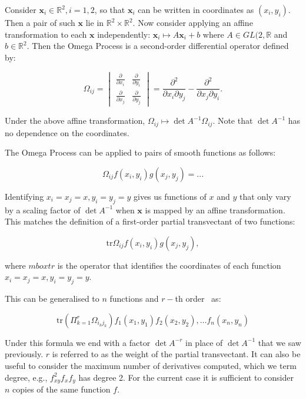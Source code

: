 \documentclass[review,onefignum,onetabnum]{siamonline190516}
\begin{document}
Consider $\mathbf{x}_i \in \mathbb{R}^2, i=1,2$, so that $\mathbf{x}_i$ can be written in coordinates as $(x_i, y_i)$. Then a pair of such $\mathbf{x}$ lie in $\mathbb{R}^2 \times \mathbb{R}^2$.  Now consider applying an affine transformation to each $\mathbf{x}$ independently: $\mathbf{x}_i \mapsto A \mathbf{x}_i + b$ where $A \in GL(2,\mathbb{R}$ and $b \in \mathbb{R}^2$. Then the Omega Process is a second-order differential operator defined by:

\begin{equation}
\Omega_{ij} = \begin{vmatrix} \frac{\partial}{\partial x_i} & \frac{\partial}{\partial y_i} \\ \frac{\partial}{\partial x_j} & \frac{\partial}{\partial y_j} \end{vmatrix}  = \frac{\partial^2}{\partial x_i \partial y_j} - \frac{\partial^2}{\partial x_j \partial y_i}.
\end{equation}

Under the above affine transformation, $\Omega_{ij} \mapsto \det A^{-1} \Omega_{ij}$. Note that $\det A^{-1}$ has no dependence on the coordinates. 

The Omega Process can be applied to pairs of smooth functions as follows:

\begin{equation}
\Omega_{ij} f(x_i, y_i) g(x_j, y_j) = ...
\end{equation}

Identifying $x_i = x_j = x, y_i = y_j = y$ gives us functions of $x$ and $y$ that only vary by a scaling factor of $\det A^{-1}$ when $\mathbf{x}$ is mapped by an affine transformation. This matches the definition of a first-order partial transvectant of two functions:

\begin{equation}
\mbox{tr} \Omega_{ij} f(x_i, y_i) g(x_j, y_j),
\end{equation}

\noindent where $mbox{tr}$  is the operator that identifies the coordinates of each function $x_i = x_j = x, y_i = y_j = y$.

This can be generalised to $n$ functions and $r-$th order~\cite{Olver} as:

\begin{equation}
\mbox{tr} \left( \Pi_{k=1}^r \Omega_{i_k j_k} \right) f_1(x_1, y_1) f_2(x_2, y_2), \ldots f_n (x_n, y_n)
\end{equation}

Under this formula we end with a factor $\det A^{-r}$ in place of $\det A^{-1}$ that we saw previously. $r$ is referred to as the weight of the partial transvectant. It can also be useful to consider the maximum number of derivatives computed, which we term degree, e.g., $f_{xy}^2 f_x f_y$ has degree 2.
For the current case it is sufficient to consider $n$ copies of the same function $f$.
\end{document}
